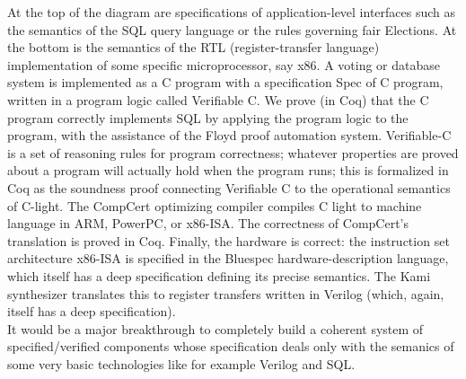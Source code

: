 At the top of the diagram are specifications of application-level interfaces such as the semantics of the SQL query language or the rules governing fair Elections. At the bottom is the semantics of the RTL (register-transfer language) implementation of some specific microprocessor, say x86. A voting or database system is implemented as a C program with a specification Spec of C program, written in a program logic called Verifiable C. We prove (in Coq) that the C program correctly implements SQL by applying the program logic to the program, with the assistance of the Floyd proof automation system. Verifiable-C is a set of reasoning rules for program correctness; whatever properties are proved about a program will actually hold when the program runs; this is formalized in Coq as the soundness proof connecting Verifiable C to the operational semantics of C-light. The CompCert optimizing compiler compiles C light to machine language in ARM, PowerPC, or x86-ISA. The correctness of CompCert's translation is proved in Coq. Finally, the hardware is correct: the instruction set architecture x86-ISA is specified in the Bluespec hardware-description language, which itself has a deep specification defining its precise semantics. The Kami synthesizer translates this to register transfers written in Verilog (which, again, itself has a deep specification).\\

It would be a major breakthrough to completely build a coherent system of specified/verified components whose specification deals only with the semanics of some very basic technologies like for example Verilog and SQL.\\


